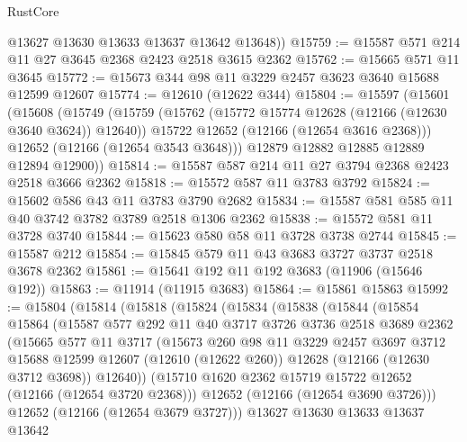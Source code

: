 \begin{lexlean}{RustCore}
\begin{coremodule}
        @13627
        @13630
        @13633
        @13637
        @13642
        @13648))
@15759 := @15587 @571 @214 @11 @27 @3645 @2368 @2423 @2518 @3615 @2362
@15762 := @15665 @571 @11 @3645
@15772 := @15673 @344 @98 @11 @3229 @2457 @3623 @3640 @15688 @12599 @12607
@15774 := @12610 (@12622 @344)
@15804 := @15597
    (@15601
      (@15608
        (@15749
          (@15759
            (@15762 (@15772 @15774 @12628 (@12166 (@12630 @3640 @3624)) @12640))
            @15722
            @12652
            (@12166 (@12654 @3616 @2368)))
          @12652
          (@12166 (@12654 @3543 @3648)))
        @12879
        @12882
        @12885
        @12889
        @12894
        @12900))
@15814 := @15587 @587 @214 @11 @27 @3794 @2368 @2423 @2518 @3666 @2362
@15818 := @15572 @587 @11 @3783 @3792
@15824 := @15602 @586 @43 @11 @3783 @3790 @2682
@15834 := @15587 @581 @585 @11 @40 @3742 @3782 @3789 @2518 @1306 @2362
@15838 := @15572 @581 @11 @3728 @3740
@15844 := @15623 @580 @58 @11 @3728 @3738 @2744
@15845 := @15587 @212
@15854 := @15845 @579 @11 @43 @3683 @3727 @3737 @2518 @3678 @2362
@15861 := @15641 @192 @11 @192 @3683 (@11906 (@15646 @192))
@15863 := @11914 (@11915 @3683)
@15864 := @15861 @15863
@15992 := @15804
    (@15814
      (@15818
        (@15824
          (@15834
            (@15838
              (@15844
                (@15854
                  @15864
                  (@15587
                    @577
                    @292
                    @11
                    @40
                    @3717
                    @3726
                    @3736
                    @2518
                    @3689
                    @2362
                    (@15665
                      @577
                      @11
                      @3717
                      (@15673
                        @260
                        @98
                        @11
                        @3229
                        @2457
                        @3697
                        @3712
                        @15688
                        @12599
                        @12607
                        (@12610 (@12622 @260))
                        @12628
                        (@12166 (@12630 @3712 @3698))
                        @12640))
                    (@15710 @1620 @2362 @15719 @15722 @12652 (@12166 (@12654 @3720 @2368)))
                    @12652
                    (@12166 (@12654 @3690 @3726)))
                  @12652
                  (@12166 (@12654 @3679 @3727)))
                @13627
                @13630
                @13633
                @13637
                @13642

\end{coremodule}
\end{lexlean}
